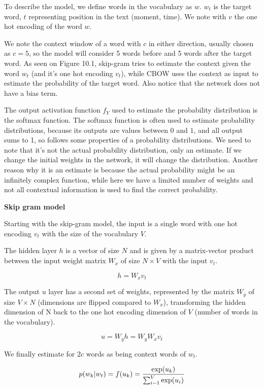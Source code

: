 To describe the model, we define words in the vocabulary as \(w\). \(w_t\) is the target word, \(t\) representing position in the text (moment, time). We note with \(v\) the one hot encoding of the word \(w\).

We note the context window of a word with \(c\) in either direction, usually chosen as \(c = 5\), so the model will consider 5 words before and 5 words after the target word. As seen on Figure 10.1, skip-gram tries to estimate the context given the word \(w_t\) (and it's one hot encoding \(v_t\)), while CBOW uses the context as input to estimate the probability of the target word. Also notice that the network does not have a bias term.

The output activation function \(f_Y\) used to estimate the probability distribution is the softmax function. The softmax function is often used to estimate probability distributions, because its outputs are values between \(0\) and \(1\), and all output sums to 1, so follows some properties of a probability distributions. We need to note that it's not the actual probability distribution, only an estimate. If we change the initial weights in the network, it will change the distribution. Another reason why it is an estimate is because the actual probability might be an infinitely complex function, while here we have a limited number of weights and not all contextual information is used to find the correct probability.

\textbf{Skip gram model}

Starting with the skip-gram model, the input is a single word with one hot encoding \(v_t\) with the size of the vocabulary \(V\).

The hidden layer \(h\) is a vector of size \(N\) and is given by a matrix-vector product between the input weight matrix \(W_x\) of size \(N \times V\) with the input \(v_t\).

\[h = W_x v_t\]

The output \(u\) layer has a second set of weights, represented by the matrix \(W_y\) of size \(V \times N\) (dimensions are flipped compared to \(W_x\)), transforming the hidden dimension of N back to the one hot encoding dimension of \(V\) (number of words in the vocabulary).

\[u = W_y h = W_y W_x v_t\]

We finally estimate for \(2c\) words as being context words of \(w_t\).

\[p(w_k|w_t) = f(u_k) = {\operatorname{exp}(u_k) \over \sum_{i-1} ^V \operatorname{exp}(u_i)}\]

